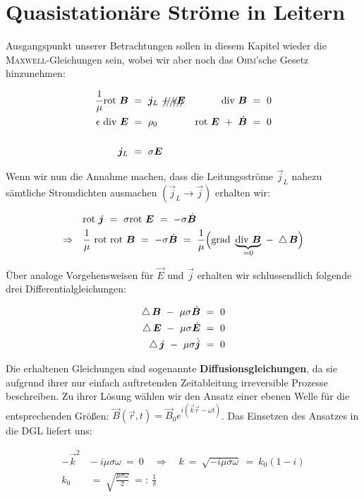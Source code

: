 \newpage
\section{Quasistationäre Ströme in Leitern}

Ausgangspunkt unserer Betrachtungen sollen in diesem Kapitel wieder die \textsc{Maxwell}-Gleichungen sein, wobei wir aber noch das \textsc{Ohm}'sche Gesetz hinzunehmen:

\begin{align*}
\frac{1}{\mu}\rot\vec{B}  \ &= \ \vec{j}_L \ \xout{+ \ \epsilon\vec{E}}  & \div\vec{B}  \ &= \ 0\\
\epsilon \ \div\vec{E} \ &= \ \rho_0  & \rot\vec{E} \ + \ \dot{\vec{B}} \ &= \ 0\\
\ \\
\vec{j}_L \ &= \ \sigma \vec{E}
\end{align*}

Wenn wir nun die Annahme machen, dass die Leitungsströme $\vec{j}_L$ nahezu sämtliche Stromdichten ausmachen $(\vec{j}_L\rightarrow\vec{j})$ erhalten wir:

\begin{align*}
&\rot \vec{j} \ = \ \sigma \rot\vec{E}  \ = \ -\sigma\dot{\vec{B}}\\
\Rightarrow \quad &\frac{1}{\mu} \ \rot\rot \vec{B} \ = \ -\sigma \dot{\vec{B}}  \ = \ \frac{1}{\mu}\Big(\grad\underbrace{\div\vec{B}}_{=0} \ - \ \laplace\vec{B}\Big)
\end{align*}

Über analoge Vorgehensweisen für $\vec{E}$ und $\vec{j}$ erhalten wir schlussendlich folgende drei Differentialgleichungen:

\begin{align*}
\mathop{{}\bigtriangleup}\nolimits \bm{B} \ - \ \mu\sigma\dot{\bm{B}} \ &= \ 0\\
\mathop{{}\bigtriangleup}\nolimits \bm{E} \ - \ \mu\sigma\dot{\bm{E}} \ &= \ 0\\
\mathop{{}\bigtriangleup}\nolimits \bm{j} \ - \ \mu\sigma\dot{\bm{j}} \ &= \ 0
\end{align*}

Die erhaltenen Gleichungen sind sogenannte \textbf{Diffusionsgleichungen}, da sie aufgrund ihrer nur einfach auftretenden Zeitableitung irreversible Prozesse beschreiben. Zu ihrer Lösung wählen wir den Ansatz einer ebenen Welle für die entsprechenden Größen: $\vec{B}(\vec{r},t)= \vec{B}_0 e^{i(\vec{k}\vec{r}-\omega t)}$. Das Einsetzen des Ansatzes in die DGL liefert uns:

\begin{align*}
-\vec{k}^2 \ &- \ i\mu\sigma\omega  \ = \ 0 \quad \Rightarrow \quad k  \ = \ \sqrt{-i\mu\sigma\omega} \ = \ k_0(1-i)\\
k_0  \ &= \ \sqrt{\frac{\mu\sigma\omega}{2}} \ =: \ \frac{1}{\delta}
\end{align*}

